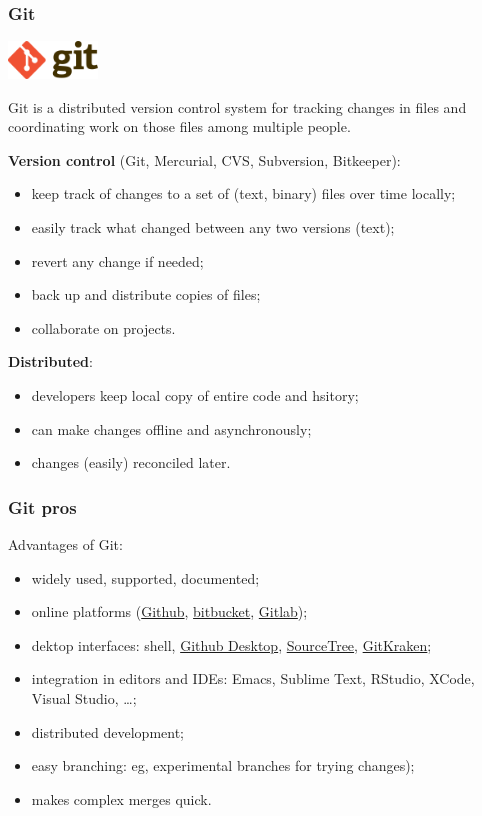 \documentclass[10pt,svgnames]{beamer}
\begin{document}
\begin{frame}
\frametitle{Git}
\includegraphics[height=1cm]{Git-logo}

Git is a distributed version control system for tracking changes in files and coordinating work on those files among multiple people.

\textbf{Version control} (Git, Mercurial, CVS, Subversion, Bitkeeper):
\begin{itemize}
   \item keep track of changes to a set of (text, binary) files over time locally;
   \item easily track what changed between any two versions (text);
   \item revert any change if needed;
   \item back up and distribute copies of files;
   \item collaborate on projects.
 \end{itemize} 

\textbf{Distributed}:
\begin{itemize}
  \item developers keep local copy of entire code and hsitory;
  \item can make changes offline and asynchronously;
  \item changes (easily) reconciled later.
\end{itemize}
\end{frame}


\begin{frame}
\frametitle{Git pros}

Advantages of Git:
\begin{itemize}
  \item widely used, supported, documented;
  \item online platforms (\href{https://github.com/}{Github}, \href{https://bitbucket.org/}{bitbucket}, \href{https://about.gitlab.com/}{Gitlab});
  \item dektop interfaces: shell, \href{https://desktop.github.com/}{Github Desktop}, \href{https://www.sourcetreeapp.com/}{SourceTree}, \href{https://www.gitkraken.com/}{GitKraken};
  \item integration in editors and IDEs: Emacs, Sublime Text, RStudio, XCode, Visual Studio, \ldots;
  \item distributed development;
  \item easy branching: eg, experimental branches for trying changes);
  \item makes complex merges quick.
\end{itemize}
\end{frame}
\end{document}
